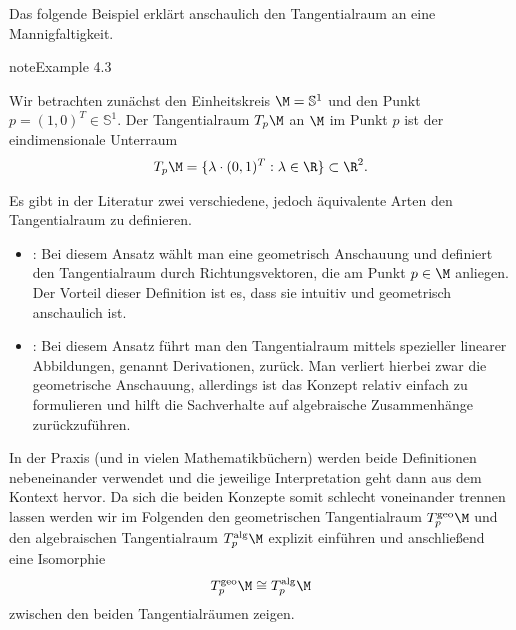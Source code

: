 \documentclass[letterpaper,10pt,german]{jupyterBook}
\begin{document}
\sphinxAtStartPar
Das folgende Beispiel erklärt anschaulich den Tangentialraum an eine Mannigfaltigkeit.
\label{manifolds/tangential:example-0}
\begin{sphinxadmonition}{note}{Example 4.3}



\sphinxAtStartPar
Wir betrachten zunächst den Einheitskreis \(\M = \mathbb{S}^1\) und den Punkt \(p = (1, 0)^T \in \mathbb{S}^1\).
Der Tangentialraum \(T_p\M\) an \(\M\) im Punkt \(p\) ist der eindimensionale Unterraum
\begin{equation*}
\begin{split}T_p\M = \lbrace \lambda \cdot (0, 1)^T : \lambda \in \R \rbrace \subset \R^2.\end{split}
\end{equation*}\end{sphinxadmonition}

\sphinxAtStartPar
Es gibt in der Literatur zwei verschiedene, jedoch äquivalente Arten den Tangentialraum zu definieren.
\begin{itemize}
\item {} 
\sphinxAtStartPar
{}: Bei diesem Ansatz wählt man eine geometrisch Anschauung und definiert den Tangentialraum durch Richtungsvektoren, die am Punkt \(p\in\M\) anliegen.
Der Vorteil dieser Definition ist es, dass sie intuitiv und geometrisch anschaulich ist.

\item {} 
\sphinxAtStartPar
{}: Bei diesem Ansatz führt man den Tangentialraum mittels spezieller linearer Abbildungen, genannt Derivationen, zurück.
Man verliert hierbei zwar die geometrische Anschauung, allerdings ist das Konzept relativ einfach zu formulieren und hilft die Sachverhalte auf algebraische Zusammenhänge zurückzuführen.

\end{itemize}

\sphinxAtStartPar
In der Praxis (und in vielen Mathematikbüchern) werden beide Definitionen nebeneinander verwendet und die jeweilige Interpretation geht dann aus dem Kontext hervor.
Da sich die beiden Konzepte somit schlecht voneinander trennen lassen werden wir im Folgenden den geometrischen Tangentialraum \(T^{\text{geo}}_p\M\) und den algebraischen Tangentialraum \(T^{\text{alg}}_p\M\) explizit einführen und anschließend eine Isomorphie
\begin{equation*}
\begin{split}T^{\text{geo}}_p\M\cong T^{\text{alg}}_p\M\end{split}
\end{equation*}
\sphinxAtStartPar
zwischen den beiden Tangentialräumen zeigen.
\end{document}
